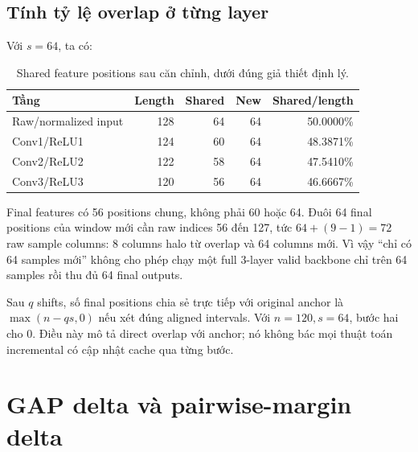 \documentclass[11pt,a4paper]{article}
\theoremstyle{definition}
\begin{document}
\subsection{Tính tỷ lệ overlap ở từng layer}
Với $s=64$, ta có:
\begin{table}[!htbp]\centering\small
\caption{Shared feature positions sau căn chỉnh, dưới đúng giả thiết định lý.}
\begin{tabularx}{\linewidth}{@{}Yrrrr@{}}\toprule
Tầng & Length & Shared & New & Shared/length\\\midrule
Raw/normalized input &128&64&64&50.0000\%\\
Conv1/ReLU1 &124&60&64&48.3871\%\\
Conv2/ReLU2 &122&58&64&47.5410\%\\
Conv3/ReLU3 &120&56&64&46.6667\%\\\bottomrule
\end{tabularx}
\end{table}
Final features có 56 positions chung, không phải 60 hoặc 64. Đuôi 64
final positions của window mới cần raw indices 56 đến 127, tức
$64+(9-1)=72$ raw sample columns: 8 columns halo từ overlap và 64 columns
mới. Vì vậy ``chỉ có 64 samples mới'' không cho phép chạy một full
3-layer valid backbone chỉ trên 64 samples rồi thu đủ 64 final outputs.

Sau $q$ shifts, số final positions chia sẻ trực tiếp với original anchor
là $\max(n-qs,0)$ nếu xét đúng aligned intervals. Với $n=120,s=64$, bước
hai cho 0. Điều này mô tả direct overlap với anchor; nó không bác mọi
thuật toán incremental có cập nhật cache qua từng bước.

\section{GAP delta và pairwise-margin delta}
\end{document}
